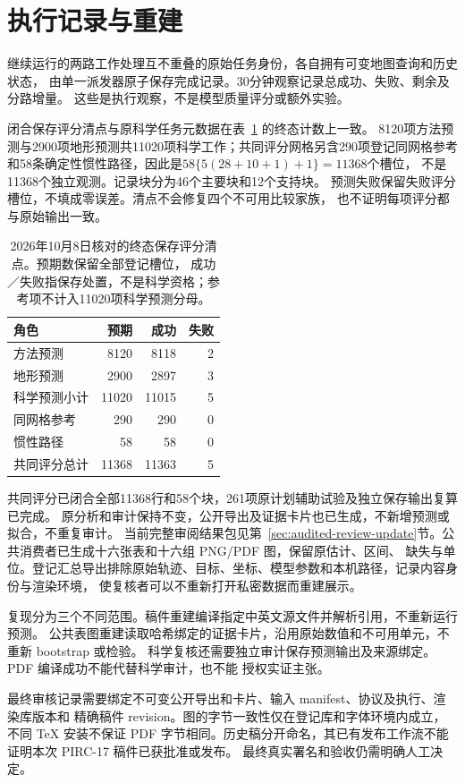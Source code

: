 \section{执行记录与重建}
\label{sec:execution-reconstruction}\hypertarget{sec:execution-reconstruction}{}
继续运行的两路工作处理互不重叠的原始任务身份，各自拥有可变地图查询和历史状态，
由单一派发器原子保存完成记录。30分钟观察记录总成功、失败、剩余及分路增量。
这些是执行观察，不是模型质量评分或额外实验。

闭合保存评分清点与原科学任务元数据在表~\ref{tab:terminal-score-inventory} 的终态计数上一致。
8120项方法预测与2900项地形预测共11020项科学工作；共同评分网格另含290项登记同网格参考
和58条确定性惯性路径，因此是$58\{5(28+10+1)+1\}=11368$个槽位，
不是11368个独立观测。记录块分为46个主要块和12个支持块。
预测失败保留失败评分槽位，不填成零误差。清点不会修复四个不可用比较家族，
也不证明每项评分都与原始输出一致。

\begin{table}[htbp]\centering\small
\caption{2026年10月8日核对的终态保存评分清点。预期数保留全部登记槽位，
成功／失败指保存处置，不是科学资格；参考项不计入11020项科学预测分母。}
\label{tab:terminal-score-inventory}\hypertarget{tab:terminal-score-inventory}{}
\begin{tabular}{@{}lrrr@{}}\toprule
角色 & 预期 & 成功 & 失败\\\midrule
方法预测 & 8120 & 8118 & 2\\
地形预测 & 2900 & 2897 & 3\\
科学预测小计 & 11020 & 11015 & 5\\
同网格参考 & 290 & 290 & 0\\
惯性路径 & 58 & 58 & 0\\
共同评分总计 & 11368 & 11363 & 5\\
\bottomrule\end{tabular}\end{table}

共同评分已闭合全部11368行和58个块，261项原计划辅助试验及独立保存输出复算已完成。
原分析和审计保持不变，公开导出及证据卡片也已生成，不新增预测或拟合，不重复审计。
当前完整审阅结果包见第~\ref{sec:audited-review-update}节。公共消费者已生成十六张表和十六组 PNG/PDF 图，保留原估计、区间、
缺失与单位。登记汇总导出排除原始轨迹、目标、坐标、模型参数和本机路径，记录内容身份与渲染环境，
使复核者可以不重新打开私密数据而重建展示。

复现分为三个不同范围。稿件重建编译指定中英文源文件并解析引用，不重新运行预测。
公共表图重建读取哈希绑定的证据卡片，沿用原始数值和不可用单元，不重新 bootstrap 或检验。
科学复核还需要独立审计保存预测输出及来源绑定。PDF 编译成功不能代替科学审计，也不能
授权实证主张。

最终审核记录需要绑定不可变公开导出和卡片、输入 manifest、协议及执行、渲染库版本和
精确稿件 revision。图的字节一致性仅在登记库和字体环境内成立，不同 TeX 安装不保证
PDF 字节相同。历史稿分开命名，其已有发布工作流不能证明本次 PIRC-17 稿件已获批准或发布。
最终真实署名和验收仍需明确人工决定。


